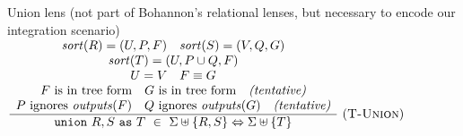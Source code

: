 \documentclass[12pt]{article}
\begin{document}
\ocwendcode{}\ocwindent{0.00em}
Union lens (not part of Bohannon's relational lenses, but necessary to encode
our integration scenario) 
\ocweol
\ocwindent{0.00em}
$\frac{
\begin{array}{c}
  \mi{sort}(R) = (U,P,F) \quad \mi{sort}(S) = (V,Q,G) \\
  \mi{sort}(T) = (U,P\cup Q,F) \\
  U = V \quad F \equiv G \\
 F\ \text{is in tree form} \quad G\ \text{is in tree form} \quad \textit{(tentative)} \\
  P\ \text{ignores}\ \mi{outputs}(F) \quad Q\ \text{ignores}\ \mi{outputs}(G) \quad\textit{(tentative)}
\end{array}}
{
\begin{array}{c}
\mt{union}\ R,S\ \mt{as}\ T\ \in\ \Sigma \uplus \{R,S\} \Leftrightarrow \Sigma \uplus \{T\}
\end{array}
}\ \text{(\textsc{T-Union})}
$
\end{document}
